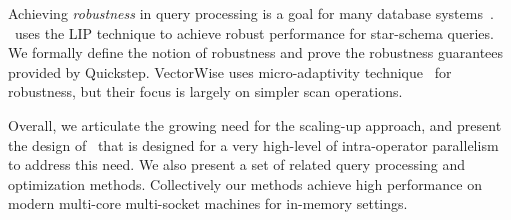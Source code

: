 Achieving \textit{robustness} in query processing is a goal for many database systems~\cite{graefe_et_al:DSP:2011:2984}.
\Quickstep\ uses the LIP technique to achieve robust performance for star-schema  queries. 
We formally define the notion of robustness and prove the robustness guarantees provided by Quickstep. 
VectorWise uses micro-adaptivity technique~\cite{DBLP:conf/sigmod/RaducanuBZ13} for robustness, but their focus is largely on simpler scan operations.


Overall, we articulate the growing need for the scaling-up approach, and present the design of \Quickstep\ that %
is designed for a very high-level of intra-operator parallelism to address this need. We also present a set of related query processing and optimization methods. Collectively our methods achieve high performance on modern multi-core multi-socket machines for in-memory settings.

